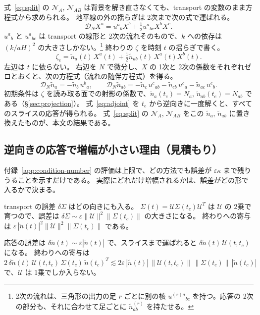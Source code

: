 \documentclass[a4paper,11pt]{ltjsarticle}
\newcommand{\DN}{\mathcal{D}_N}
\begin{document}
式~\eqref{eq:split} の $\mathcal N_A$, $\mathcal N_{AB}$ は背景を解き直さなくても、transport の変数のまま方程式から求められる。
地平線の外の揺らぎは 2次まで次の式で運ばれる。
\begin{equation}
\DN X^a=u^a{}_bX^b+\tfrac12u^a{}_{bc}X^bX^c .
\end{equation}
$u^a{}_b$ と $u^a{}_{bc}$ は transport の線形と 2次の流れそのもので、$k$ への依存は $(k/aH)^2$ の大きさしかない。\footnote{%
2次の流れは、三角形の出力の足 $r$ ごとに別の核 $u^{(r)a}{}_{bc}$ を持つ。応答の 2次の部分も、それに合わせて足ごとに $\tilde n^{(r)}_{ab}$ を持たせる。}
終わりの $\zeta$ を時刻 $t$ の揺らぎで書く。
\begin{equation}
\zeta_e=\tilde n_a(t)\,X^a(t)+\tfrac12\tilde n_{ab}(t)\,X^a(t)X^b(t) .
\end{equation}
左辺は $t$ に依らない。
右辺を $N$ で微分し、$X$ の 1次と 2次の係数をそれぞれゼロとおくと、次の方程式（流れの随伴方程式）を得る。
\begin{equation}
\DN\tilde n_a=-\tilde n_b\,u^b{}_a,\qquad
\DN\tilde n_{ab}=-\tilde n_c\,u^c{}_{ab}-\tilde n_{cb}\,u^c{}_a-\tilde n_{ac}\,u^c{}_b .
\label{eq:adjoint}
\end{equation}
初期条件は $\zeta$ を読み取る面での射影の係数で、$\tilde n_a(t_e)=N_a$, $\tilde n_{ab}(t_e)=N_{ab}$ である（\S\ref{sec:projection}）。
式~\eqref{eq:adjoint} を $t_e$ から逆向きに一度解くと、すべてのスライスの応答が得られる。
式~\eqref{eq:split} の $\mathcal N_A$, $\mathcal N_{AB}$ をこの $\tilde n_a$, $\tilde n_{ab}$ に置き換えたものが、本文の結果である。

\subsection{逆向きの応答で増幅が小さい理由（見積もり）}

付録~\ref{app:condition-number} の評価は上限で、どの方法でも誤差が $\varepsilon\kappa$ まで残りうることを示すだけである。
実際にどれだけ増幅されるかは、誤差がどの形で入るかで決まる。

transport の誤差 $\delta\Sigma$ はどの向きにも入る。
$\Sigma(t)=\mathcal U\Sigma(t_c)\mathcal U^T$ は $\mathcal U$ の 2乗で育つので、誤差は $\delta\Sigma\sim\varepsilon\|\mathcal U\|^2\|\Sigma(t_c)\|$ の大きさになる。
終わりへの寄与は $\varepsilon\,|\tilde n(t)|^2\|\mathcal U\|^2\|\Sigma(t_c)\|$ である。

応答の誤差は $\delta\tilde n(t)\sim\varepsilon|\tilde n(t)|$ で、スライスまで運ばれると $\delta\tilde n(t)\,\mathcal U(t,t_c)$ になる。
終わりへの寄与は
\[
2\,\delta\tilde n(t)\,\mathcal U(t,t_c)\,\Sigma(t_c)\,\tilde n(t_c)^T\lesssim2\varepsilon\,|\tilde n(t)|\,\|\mathcal U(t,t_c)\|\,\|\Sigma(t_c)\|\,|\tilde n(t_c)|
\]
で、$\mathcal U$ は 1乗でしか入らない。
\end{document}
